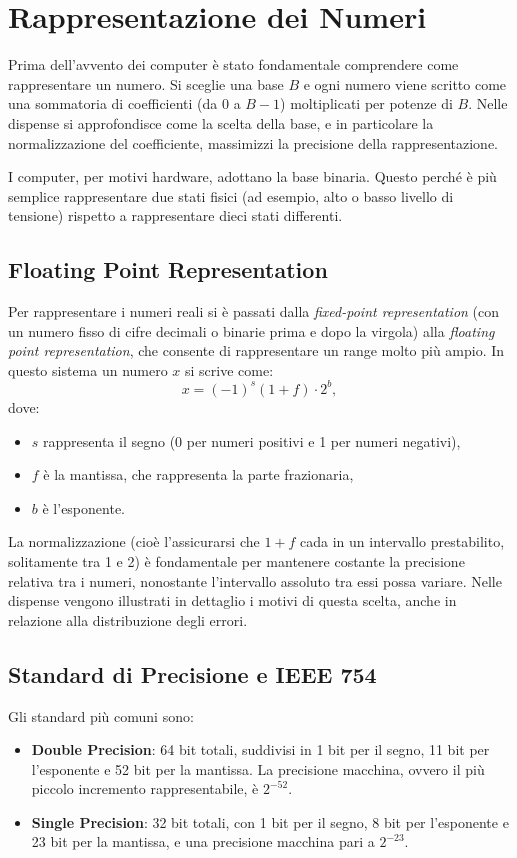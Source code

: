 \documentclass{article}
\begin{document}
\section{Rappresentazione dei Numeri}
    Prima dell'avvento dei computer è stato fondamentale comprendere come rappresentare un numero. Si sceglie una base $B$ 
    e ogni numero viene scritto come una sommatoria di coefficienti (da 0 a $B-1$) moltiplicati per potenze di $B$. 
    Nelle dispense si approfondisce come la scelta della base, e in particolare la normalizzazione del coefficiente, 
    massimizzi la precisione della rappresentazione.

    I computer, per motivi hardware, adottano la base binaria. Questo perché è più semplice rappresentare due stati fisici (ad esempio, alto o basso livello di tensione) rispetto a rappresentare dieci stati differenti.

    \subsection{Floating Point Representation}
        Per rappresentare i numeri reali si è passati dalla \textit{fixed-point representation} (con un numero fisso di cifre decimali o binarie prima e dopo la virgola) alla \textit{floating point representation}, che consente di rappresentare un range molto più ampio. In questo sistema un numero $x$ si scrive come:
        \[
            x = (-1)^s (1 + f) \cdot 2^b,
        \]
        dove:
        \begin{itemize}
            \item $s$ rappresenta il segno (0 per numeri positivi e 1 per numeri negativi),
            \item $f$ è la mantissa, che rappresenta la parte frazionaria,
            \item $b$ è l'esponente.
        \end{itemize}
        La normalizzazione (cioè l'assicurarsi che $1+f$ cada in un intervallo prestabilito, solitamente tra 1 e 2) è fondamentale per mantenere costante la precisione relativa tra i numeri, nonostante l'intervallo assoluto tra essi possa variare. Nelle dispense vengono illustrati in dettaglio i motivi di questa scelta, anche in relazione alla distribuzione degli errori.

    \subsection{Standard di Precisione e IEEE 754}
        Gli standard più comuni sono:
        \begin{itemize}
            \item \textbf{Double Precision}: 64 bit totali, suddivisi in 1 bit per il segno, 11 bit per l'esponente e 52 bit per la mantissa. La precisione macchina, ovvero il più piccolo incremento rappresentabile, è $2^{-52}$.
            \item \textbf{Single Precision}: 32 bit totali, con 1 bit per il segno, 8 bit per l'esponente e 23 bit per la mantissa, e una precisione macchina pari a $2^{-23}$.
        \end{itemize}
\end{document}
